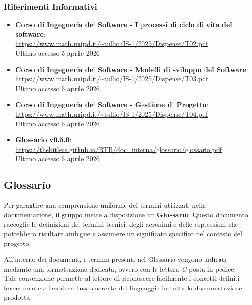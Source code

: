\documentclass[a4paper, 10pt, colorlinks=true, linkcolor=black, urlcolor=blue, citecolor=blue, hidelinks]{article}
\begin{document}
\subsubsection{Riferimenti Informativi}
\begin{itemize}
    \item \textbf{Corso di Ingegneria del Software - I processi di ciclo di vita del software}: \\
    \url{https://www.math.unipd.it/~tullio/IS-1/2025/Dispense/T02.pdf} \\
    Ultimo accesso 5 aprile 2026

    \item \textbf{Corso di Ingegneria del Software - Modelli di sviluppo del Software}: \\
    \url{https://www.math.unipd.it/~tullio/IS-1/2025/Dispense/T03.pdf} \\
    Ultimo accesso 5 aprile 2026

    \item \textbf{Corso di Ingegneria del Software - Gestione di Progetto}: \\
    \url{https://www.math.unipd.it/~tullio/IS-1/2025/Dispense/T04.pdf} \\
    Ultimo accesso 5 aprile 2026

    \item \textbf{Glossario v0.5.0}: \\
    \url{https://thebitless.github.io/RTB/doc_interna/glossario/glossario.pdf} \\
    Ultimo accesso 5 aprile 2026
\end{itemize}

\subsection{Glossario}

Per garantire una comprensione uniforme dei termini utilizzati nella documentazione, il gruppo mette a disposizione un \textbf{Glossario}. Questo documento raccoglie le definizioni dei termini tecnici, degli acronimi e delle espressioni che potrebbero risultare ambigue o assumere un significato specifico nel contesto del progetto.

All'interno dei documenti, i termini presenti nel Glossario vengono indicati mediante una formattazione dedicata, ovvero con la lettera \textit{G} posta in pedice. Tale convenzione permette al lettore di riconoscere facilmente i concetti definiti formalmente e favorisce l'uso coerente del linguaggio in tutta la documentazione prodotta.
\end{document}
